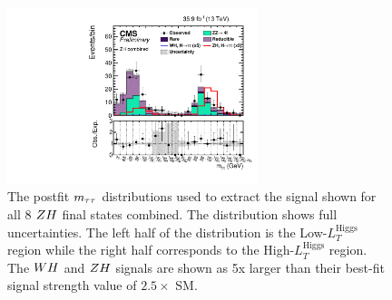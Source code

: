 

\begin{figure}[h!]
 \begin{center}
  \includegraphics[width=0.65\textwidth]{higgs_to_taus_vh/plots/zh/zh_postfit.pdf}
 \end{center}
 \caption{The postfit $m_{\tau\tau}$ distributions used to extract the signal shown
  for all 8 $ZH$ final states combined.
  The distribution shows full uncertainties.
  The left half of the distribution is the Low-$L_{T}^{\textrm{Higgs}}$ region
  while the right half corresponds to the High-$L_{T}^{\textrm{Higgs}}$ region.
  The $WH$ and $ZH$ signals are shown as 5x larger than their best-fit
  signal strength value of $2.5 \times$ SM.
 }
 \label{fig:zh_results_svFitAll}
\end{figure}



